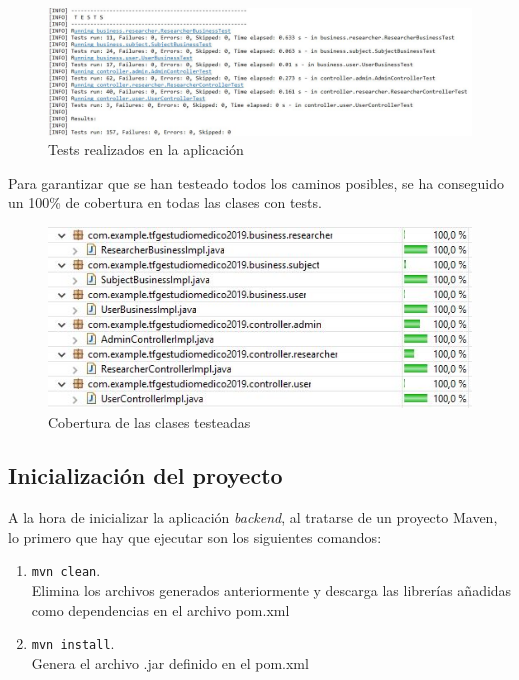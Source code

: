           \begin{figure}[h]
            \centering
            \includegraphics[width=1\textwidth]{images/numtests.JPG}
            \caption{Tests realizados en la aplicación}
        \end{figure}
        
        Para garantizar que se han testeado todos los caminos posibles, se ha conseguido un 100\% de cobertura en todas las clases con tests.
        \newline
        
        
          \begin{figure}[h]
            \centering
            \includegraphics[width=1\textwidth]{images/coberturatests.JPG}
            \caption{Cobertura de las clases testeadas}
        \end{figure}
        \FloatBarrier
        

        
        
    \subsection{Inicialización del proyecto}
        A la hora de inicializar la aplicación \textit{backend}, al tratarse de un proyecto  Maven, lo primero que hay que ejecutar son los siguientes comandos: 
        
        \begin{enumerate}
          \item\texttt{mvn clean}.\\
          Elimina los archivos generados anteriormente y descarga las librerías añadidas como dependencias en el archivo pom.xml
          \item\texttt{mvn install}. \\
          Genera el archivo .jar definido en el pom.xml
        \end{enumerate}
        
